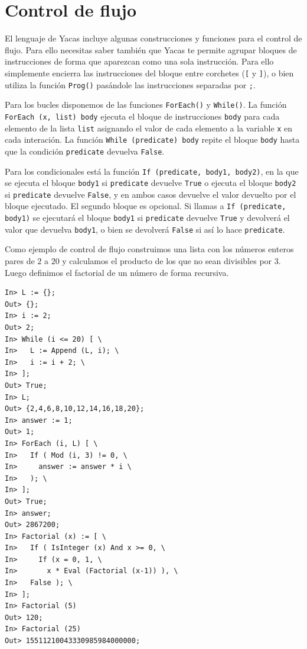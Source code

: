 \section{Control de flujo}


El lenguaje de  Yacas incluye algunas construcciones  y funciones para
el control  de flujo. Para ello  necesitas saber también que  Yacas te
permite agrupar bloques  de instrucciones de forma  que aparezcan como
una sola instrucción. Para ello simplemente encierra las instrucciones
del  bloque entre  corchetes  (\verb+[+ y  \verb+]+),  o bien  utiliza
la  función \verb+Prog()+  pasándole las  instrucciones separadas  por
\verb+;+.

Para  los  bucles  disponemos  de  las  funciones  \verb+ForEach()+  y
\verb+While()+. La  función \verb+ForEach (x, list) body+  ejecuta  el
bloque de  instrucciones \verb+body+  para cada  elemento de  la lista
\verb+list+ asignando el valor de cada elemento a la variable \verb+x+
en cada interación. La función \verb+While (predicate) body+ repite el
bloque \verb+body+  hasta que  la condición  \verb+predicate+ devuelva
\verb+False+.

Para   los  condicionales   está  la   función  
\verb+If (predicate, body1, body2)+,
en la  que  se  ejecuta  el bloque  \verb+body1+  si
\verb+predicate+ devuelve \verb+True+ o ejecuta el bloque \verb+body2+
si \verb+predicate+  devuelve \verb+False+, y en  ambos casos devuelve
el  valor devuelto  por  el  bloque ejecutado.  El  segundo bloque  es
opcional.  Si  llamas  a  \verb+If (predicate,  body1)+  se  ejecutará
el  bloque \verb+body1+  si  \verb+predicate+  devuelve \verb+True+  y
devolverá  el valor  que devuelva  \verb+body1+, o  bien se  devolverá
\verb+False+ si así lo hace \verb+predicate+.

Como ejemplo de control de flujo construimos una lista con los números
enteros pares  de $2$ a  $20$ y calculamos el  producto de los  que no
sean divisibles por $3$. Luego definimos  el factorial de un número de
forma recursiva.

\begin{verbatim}
In> L := {};
Out> {};
In> i := 2;
Out> 2;
In> While (i <= 20) [ \
In>   L := Append (L, i); \
In>   i := i + 2; \
In> ];
Out> True;
In> L;
Out> {2,4,6,8,10,12,14,16,18,20};
In> answer := 1;
Out> 1;
In> ForEach (i, L) [ \
In>   If ( Mod (i, 3) != 0, \
In>     answer := answer * i \
In>   ); \
In> ];
Out> True;
In> answer;
Out> 2867200;
In> Factorial (x) := [ \
In>   If ( IsInteger (x) And x >= 0, \
In>     If (x = 0, 1, \
In>       x * Eval (Factorial (x-1)) ), \
In>   False ); \
In> ];
In> Factorial (5)
Out> 120;
In> Factorial (25)
Out> 15511210043330985984000000;
\end{verbatim}

